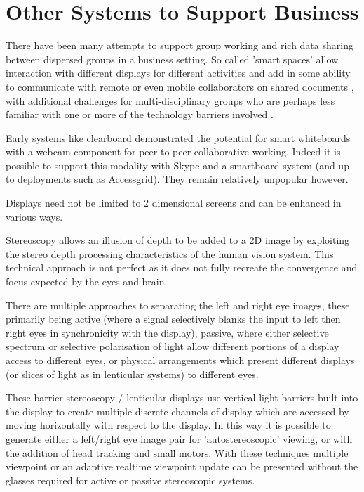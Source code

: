 \section{Other Systems to Support Business}                  
There have been many attempts to support group working and rich data sharing between dispersed groups in a business setting. So called 'smart spaces' allow interaction with different displays for different activities and add in some ability to communicate with remote or even mobile collaborators on shared documents \cite{Bardram2012}, with additional challenges for multi-disciplinary groups who are perhaps less familiar with one or more of the technology barriers involved \cite{Adamczyk2007}.\par
Early systems like clearboard \cite{Ishii1993} demonstrated the potential for smart whiteboards with a webcam component for peer to peer collaborative working. Indeed it is possible to support this modality with Skype and a smartboard system (and up to deployments such as Accessgrid). They remain relatively unpopular however.\par
Displays need not be limited to 2 dimensional screens and can be enhanced in various ways.\par
Stereoscopy allows an illusion of depth to be added to a 2D image by exploiting the stereo depth processing characteristics of the human vision system. This technical approach is not perfect as it does not fully recreate the convergence and focus expected by the eyes and brain.\par %
There are multiple approaches to separating the left and right eye images, these primarily being active (where a signal selectively blanks the input to left then right eyes in synchronicity with the display), passive, where either selective spectrum or selective polarisation of light allow different portions of a display access to different eyes, or physical arrangements which present different displays (or slices of light as in lenticular systems) to different eyes.\par
These barrier stereoscopy / lenticular displays use vertical light barriers built into the display to create multiple discrete channels of display which are accessed by moving horizontally with respect to the display. In this way it is possible to generate either a left/right eye image pair for 'autostereoscopic' viewing, or with the addition of head tracking and small motors. With these techniques multiple viewpoint or an adaptive realtime viewpoint update can be presented without the glasses required for active or passive stereoscopic systems. \par
